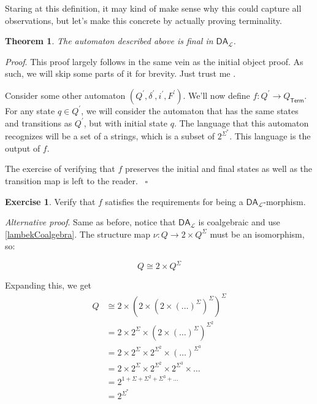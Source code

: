 \documentclass{article}
\theoremstyle{plain}
\newtheorem{theorem}{Theorem}
\theoremstyle{definition}
\newtheorem{exercise}{Exercise}
\begin{document}
Staring at this definition, it may kind of make sense why this could capture all observations, but let's make this concrete by actually proving terminality.

\begin{theorem}
The automaton described above is final in \ensuremath{{\mathsf{DA}}_{\mathcal{L}}}.
\end{theorem}


\emph{Proof}. This proof largely follows in the same vein as the initial object proof. As such, we will skip some parts of it for brevity. Just trust me .

Consider some other automaton \ensuremath{\left( {Q}^{'}, {\delta }^{'}, {i}^{'}, {F}^{'} \right)}. We'll now define \ensuremath{f : {Q}^{'} \rightarrow {Q}_{\mathsf{Term}}}. For any state \ensuremath{q \in {Q}^{'}}, we will consider the automaton that has the same states and transitions as \ensuremath{{Q}^{'}}, but with initial state \ensuremath{q}. The language that this automaton recognizes will be a set of a strings, which is a subset of \ensuremath{{2}^{{\Sigma }^{\ast }}}. This language is the output of \ensuremath{f}.

The exercise of verifying that \ensuremath{f} preserves the initial and final states as well as the transition map is left to the reader.  ~\ensuremath{\square}

\begin{exercise}
Verify that \ensuremath{f} satisfies the requirements for being a \ensuremath{{\mathsf{DA}}_{\mathcal{L}}}-morphism.
\end{exercise}


\emph{Alternative proof}.  Same as before, notice that \ensuremath{{\mathsf{DA}}_{\mathcal{L}}} is coalgebraic and use \ref{lambekCoalgebra}. The structure map \ensuremath{\nu : Q \rightarrow 2 \times {Q}^{\Sigma }} must be an isomorphism, so:

\[
Q \cong 2 \times {Q}^{\Sigma }
\]

Expanding this, we get \[
\begin{aligned}
Q & \cong 2 \times {\left( 2 \times {\left( 2 \times {\left( \ldots \right)}^{\Sigma } \right)}^{\Sigma } \right)}^{\Sigma } \\ & = 2 \times {2}^{\Sigma } \times {\left( 2 \times {\left( \ldots \right)}^{\Sigma } \right)}^{{\Sigma }^{2}} \\ & = 2 \times {2}^{\Sigma } \times {2}^{{\Sigma }^{2}} \times {\left( \ldots \right)}^{{\Sigma }^{3}} \\ & = 2 \times {2}^{\Sigma } \times {2}^{{\Sigma }^{2}} \times {2}^{{\Sigma }^{3}} \times \ldots \\ & = {2}^{1 + \Sigma + {\Sigma }^{2} + {\Sigma }^{3} + \ldots } \\ & = {2}^{{\Sigma }^{\ast }}
\end{aligned}
\]
\end{document}
